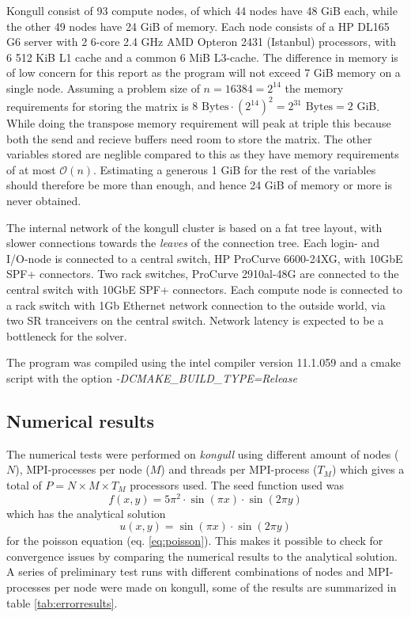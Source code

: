 \documentclass[11pt,a4paper,english]{article}
\numberwithin{figure}{subsection}
\numberwithin{table}{subsection}
\begin{document}
Kongull consist of 93 compute nodes, of which 44 nodes have 48 GiB each, while the other 49 nodes have 24 GiB of memory. Each node consists of a HP DL165 G6 server with 2 6-core 2.4 GHz AMD Opteron 2431 (Istanbul) processors, with 6 512 KiB L1 cache and a common 6 MiB L3-cache. The difference in memory is of low concern for this report as the program will not exceed 7 GiB memory on a single node. Assuming a problem size of $n=16384=2^{14}$ the memory requirements for storing the matrix is $8\text{ Bytes}\cdot (2^{14})^2 = 2^{31} \text{ Bytes} = 2 \text{ GiB}$. While doing the transpose memory requirement will peak at triple this because both the send and recieve buffers need room to store the matrix. The other variables stored are neglible compared to this as they have memory requirements of at most $\mathcal{O}(n)$. Estimating a generous 1 GiB for the rest of the variables should therefore be more than enough, and hence 24 GiB of memory or more is never obtained.

The internal network of the kongull cluster is based on a fat tree layout, with slower connections towards the \textit{leaves} of the connection tree. Each login- and I/O-node is connected to a central switch, HP ProCurve 6600-24XG, with 10GbE SPF+ connectors. Two rack switches, ProCurve 2910al-48G are connected to the central switch with 10GbE SPF+ connectors. Each compute node is connected to a rack switch with 1Gb Ethernet network connection to the outside world, via two SR tranceivers on the central switch.\cite{kongull}
Network latency is expected to be a bottleneck for the solver.

The program was compiled using the intel compiler version 11.1.059 and a cmake script with the option \textit{-DCMAKE\_BUILD\_TYPE=Release}

\subsection{Numerical results}
The numerical tests were performed on \textit{kongull} using different amount of nodes ($N$), MPI-processes per node ($M$) and threads per MPI-process ($T_M$) which gives a total of $P=N\times M\times T_M$ processors used. The seed function used was
\begin{equation*}
	f(x,y) = 5\pi^2\cdot\sin(\pi x)\cdot\sin(2\pi y)
\end{equation*}
which has the analytical solution
\begin{equation*}
	u(x,y) = \sin(\pi x)\cdot\sin(2\pi y)
\end{equation*}
for the poisson equation (eq. \eqref{eq:poisson}). This makes it possible to check for convergence issues by comparing the numerical results to the analytical solution. A series of preliminary test runs with different combinations of nodes and MPI-processes per node were made on kongull, some of the results are summarized in table \ref{tab:errorresults}. 
\end{document}
